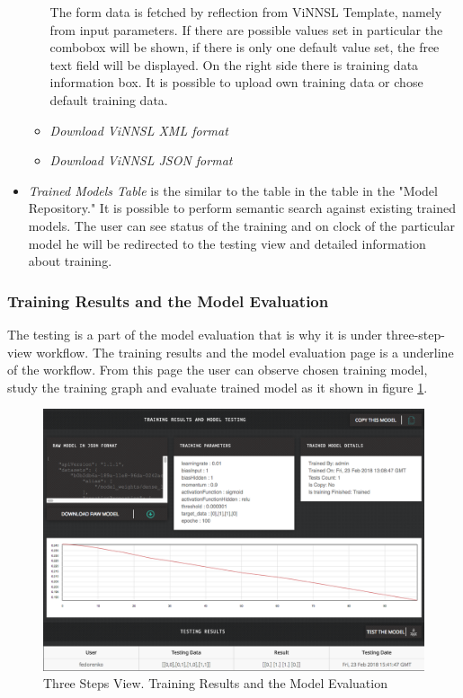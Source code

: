\begin{itemize}
\begin{itemize}
The form data is fetched by reflection from ViNNSL Template, namely from input parameters. If there are possible values set in particular the combobox will be shown, if there is only one default value set, the free text field will be displayed.  On the right side there is training data information box. It is possible to upload own training data or chose default training data.

\item \emph{Download ViNNSL XML format}
\item \emph{Download ViNNSL JSON format}
\end{itemize}

\item \emph{Trained Models Table} is the similar to the table in the table in the "Model Repository." It is possible to perform semantic search against existing trained models. The user can see status of the training and on clock of the particular model he will be redirected to the testing view and detailed information about training.

\end{itemize}

\subsubsection{Training Results and the Model Evaluation}\label{Training results and the model evaluation}

The testing is a part of the model evaluation that is why it is under three-step-view workflow. The training results and the model evaluation page is a underline of the workflow. From this page the user can observe chosen training model, study the training graph and evaluate trained model as it shown in figure \ref{fig:testing_model}.

\begin{figure}[htbp]
\begin{center}
  \includegraphics[width=\linewidth]{components/5/img/testing_model.png}
  \caption{Three Steps View. Training Results and the Model Evaluation}
  \label{fig:testing_model}
\end{center}
\end{figure}

